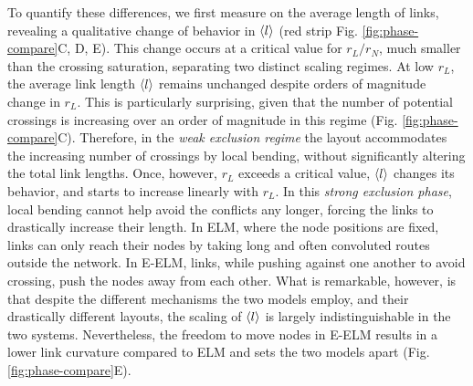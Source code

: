 \documentclass[nofootinbib,preprint,floatfix,titlepage,endfloats]{revtex4} %
\begin{document}
To quantify these differences, we first measure on the average length of links,
revealing a qualitative change of behavior in $\left<l\right>$ (red strip Fig. \ref{fig:phase-compare}C, D, E). This change occurs at a critical value for $r_L/r_N$, much smaller than the crossing saturation, separating two distinct scaling regimes. At low $r_L$, the average link length $\left<l\right>$ remains unchanged despite orders of magnitude change in $r_L$.
This is particularly surprising, given that the number of potential crossings is increasing over an order of magnitude in this regime (Fig. \ref{fig:phase-compare}C). 
Therefore, in the {\em weak exclusion regime} the layout accommodates the increasing number of crossings by local bending, without significantly altering the total link lengths. 
Once, however, $r_L$ exceeds a critical value, $\left<l\right>$ changes its behavior, and starts to increase linearly with $r_L$. 
In this {\em strong exclusion phase}, local bending cannot help avoid the conflicts any longer, forcing the links to drastically increase their length. 
In ELM, where the node positions are fixed, links can only reach their nodes by taking long and often convoluted routes outside the network. 
In E-ELM, links, while pushing against one another to avoid crossing, push the nodes away from each other. 
What is remarkable, however, is that despite the different mechanisms the two models employ, and their drastically different layouts, the scaling of $\left<l\right>$ is largely indistinguishable in the two systems.
Nevertheless, the freedom to move nodes in E-ELM results in a lower link curvature compared to ELM and sets the two models apart (Fig. \ref{fig:phase-compare}E).  
\end{document}
